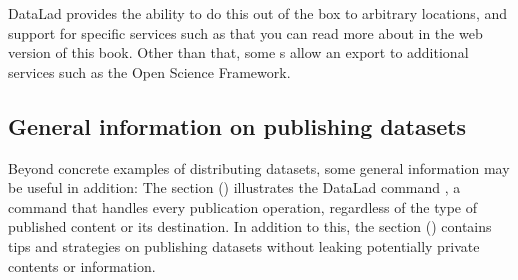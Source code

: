 \sphinxAtStartPar
DataLad provides the ability to do this out of the box to arbitrary locations, and support for specific services such as  that you can read more about in the web version of this book.
Other than that, some {\hyperref[\detokenize{glossary:term-DataLad-extension}]{}}s allow an export to additional services such as the Open Science Framework.


\subsection{General information on publishing datasets}
\label{\detokenize{basics/101-138-sharethirdparty:general-information-on-publishing-datasets}}
\sphinxAtStartPar
Beyond concrete examples of distributing datasets, some general information may be useful in addition:
The section {\hyperref[\detokenize{basics/101-141-push:push}]{}} () illustrates the DataLad command , a command that handles every publication operation, regardless of the type of published content or its destination.
In addition to this, the section {\hyperref[\detokenize{basics/101-139-privacy:privacy}]{}} () contains tips and strategies on publishing datasets without leaking potentially private contents or information.

\sphinxstepscope



